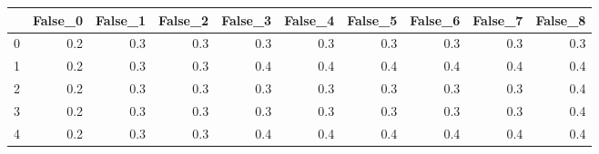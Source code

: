 \begin{tabular}{lrrrrrrrrr}
\toprule
{} &  False\_0 &  False\_1 &  False\_2 &  False\_3 &  False\_4 &  False\_5 &  False\_6 &  False\_7 &  False\_8 \\ \hline
\midrule
0 &      0.2 &      0.3 &      0.3 &      0.3 &      0.3 &      0.3 &      0.3 &      0.3 &      0.3 \\ \hline
1 &      0.2 &      0.3 &      0.3 &      0.4 &      0.4 &      0.4 &      0.4 &      0.4 &      0.4 \\ \hline
2 &      0.2 &      0.3 &      0.3 &      0.3 &      0.3 &      0.3 &      0.3 &      0.3 &      0.4 \\ \hline
3 &      0.2 &      0.3 &      0.3 &      0.3 &      0.3 &      0.3 &      0.3 &      0.3 &      0.4 \\ \hline
4 &      0.2 &      0.3 &      0.3 &      0.4 &      0.4 &      0.4 &      0.4 &      0.4 &      0.4 \\ \hline
\bottomrule
\end{tabular}
